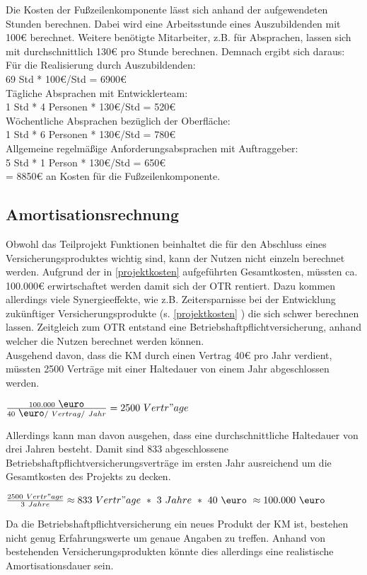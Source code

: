 Die Kosten der Fußzeilenkomponente lässt sich anhand der aufgewendeten Stunden berechnen.
Dabei wird eine Arbeitsstunde eines Auszubildenden mit 100€ berechnet. Weitere benötigte Mitarbeiter, z.B. für Absprachen, lassen sich mit durchschnittlich 130€ pro Stunde berechnen. 
Demnach ergibt sich daraus:\\
Für die Realisierung durch Auszubildenden: \\
69 Std * 100€/Std = 6900€ \\
Tägliche Absprachen mit Entwicklerteam: \\
1 Std * 4 Personen * 130€/Std = 520€\\
Wöchentliche Absprachen bezüglich der Oberfläche:  \\
1 Std * 6 Personen * 130€/Std = 780€\\
Allgemeine regelmäßige Anforderungsabsprachen mit Auftraggeber:  \\
5 Std * 1 Person *  130€/Std = 650€\\

= 8850€ an Kosten für die Fußzeilenkomponente.
\subsection{Amortisationsrechnung}
\label{amortisationsdauer}
Obwohl das Teilprojekt Funktionen beinhaltet die für den Abschluss eines Versicherungsproduktes wichtig sind, kann der Nutzen nicht einzeln berechnet werden. Aufgrund der in \ref{projektkosten}  aufgeführten Gesamtkosten, müssten ca. 100.000€ erwirtschaftet werden damit sich der \ac{OTR} rentiert. Dazu kommen allerdings viele Synergieeffekte, wie z.B. Zeitersparnisse bei der Entwicklung zukünftiger Versicherungsprodukte (s. \ref{projektkosten} ) die sich schwer berechnen lassen. Zeitgleich zum \ac{OTR} entstand eine Betriebshaftpflichtversicherung, anhand welcher die Nutzen berechnet werden können.\\
Ausgehend davon, dass die \ac{KM} durch einen Vertrag 40€ pro Jahr verdient, müssten 2500 Verträge mit einer Haltedauer von einem Jahr abgeschlossen werden.\\
\begin{center}
	$ \frac{100.000\ \mbox{\euro}}{40\ \mbox{\euro}/\ Vertrag/\ Jahr} = 2500\ Vertr"age $\\
\end{center}
Allerdings kann man davon ausgehen, dass eine durchschnittliche Haltedauer von drei Jahren besteht. Damit sind 833 abgeschlossene Betriebshaftpflichtversicherungsverträge im ersten Jahr ausreichend um die Gesamtkosten des Projekts zu decken.
\begin{center}
	$ \frac{2500\ Vertr"age}{3\ Jahre} \approx833\ Vertr"age\ *\ 3\ Jahre\ *\ 40\ \mbox{\euro}\ \approx100.000\ \mbox{\euro} $\\
\end{center}
 Da die Betriebshaftpflichtversicherung ein neues Produkt der \ac{KM} ist, bestehen nicht genug Erfahrungswerte um genaue Angaben zu treffen. Anhand von bestehenden Versicherungsprodukten könnte dies allerdings eine realistische Amortisationsdauer sein.


